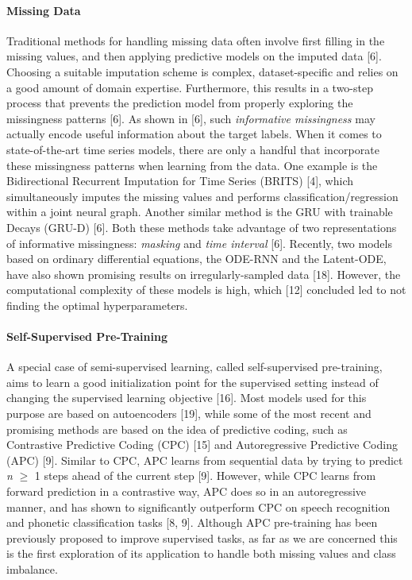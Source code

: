 \documentclass{article}
\begin{document}
\paragraph{Missing Data}
Traditional methods for handling missing data often involve first filling in the missing values, 
and then applying predictive models on the imputed data [6].
Choosing a suitable imputation scheme is complex, dataset-specific and relies on a good amount of domain expertise. Furthermore, this results in a two-step process that prevents
the prediction model from properly exploring the missingness patterns
[6].
As shown in [6], such \textit{informative missingness} may 
actually encode useful information about the target labels.
When it comes to state-of-the-art time series models, there are only a handful that incorporate these missingness patterns when learning from the data. One example is the Bidirectional Recurrent Imputation for Time Series (BRITS) [4],
which simultaneously imputes the missing values and performs classification/regression within a joint neural graph.
Another similar method is the GRU with trainable Decays (GRU-D) [6].
Both these methods
take advantage of two representations of informative missingness: \textit{masking} and \textit{time interval} [6].
Recently, two models based on ordinary differential equations, the ODE-RNN and the Latent-ODE, have also shown promising results on irregularly-sampled data [18].
However, the computational complexity of these models is high, which [12] concluded led to not finding the optimal hyperparameters.





\paragraph{Self-Supervised Pre-Training}
A special case of semi-supervised learning, called self-supervised pre-training, aims to learn a good initialization point for the supervised setting instead of changing the supervised learning objective [16].
Most models used for this purpose are based on autoencoders [19], while some of the most recent and promising methods 
are based on the idea of predictive coding, such as Contrastive Predictive Coding (CPC) [15]
and Autoregressive Predictive Coding (APC) [9].
Similar to CPC, APC learns from sequential data by trying to predict \textit{n} $\geq$ 1 steps ahead of the current step [9]. However, while CPC learns from forward prediction in a contrastive way, APC does so in an autoregressive manner, and has shown to significantly outperform CPC on speech recognition and phonetic classification tasks [8, 9]. Although APC pre-training has been previously proposed to improve supervised tasks, as far as we are concerned this is the first exploration of its application to handle both missing values and class imbalance. 
\end{document}
